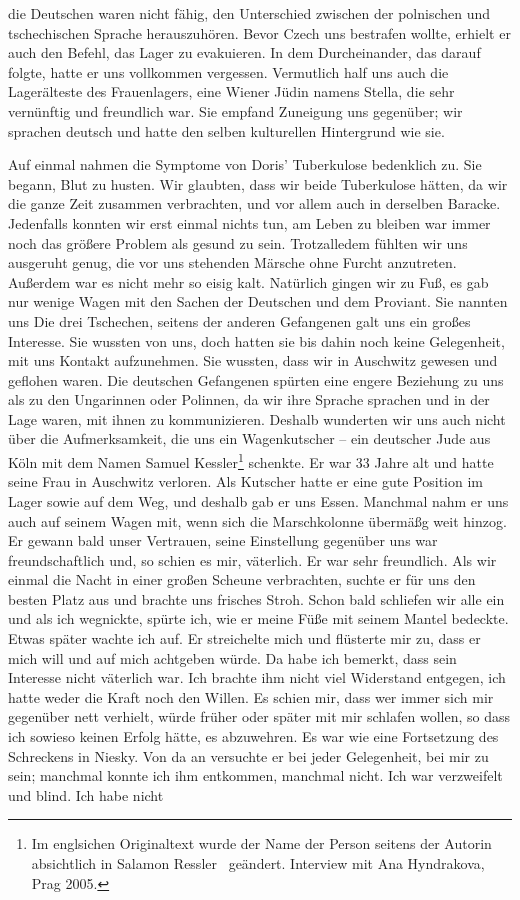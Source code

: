 die Deutschen waren nicht fähig, den Unterschied zwischen der polnischen und tschechischen Sprache herauszuhören. Bevor Czech uns bestrafen wollte, erhielt er auch den Befehl, das Lager zu evakuieren. In dem Durcheinander, das darauf folgte, hatte er uns vollkommen vergessen. Vermutlich half uns auch die Lagerälteste des Frauenlagers, eine Wiener Jüdin namens Stella, die sehr vernünftig und freundlich war. Sie empfand Zuneigung uns gegenüber; wir sprachen deutsch und hatte den selben kulturellen Hintergrund wie sie.

Auf einmal nahmen die Symptome von Doris' Tuberkulose bedenklich zu. Sie begann, Blut zu husten. Wir glaubten, dass wir beide Tuberkulose hätten, da wir die ganze Zeit zusammen verbrachten, und vor allem auch in derselben Baracke. Jedenfalls konnten wir erst einmal nichts tun, am Leben zu bleiben war immer noch das größere Problem als gesund zu sein. Trotzalledem fühlten wir uns ausgeruht genug, die vor uns stehenden Märsche ohne Furcht anzutreten. Außerdem war es nicht mehr so eisig kalt. Natürlich gingen wir zu Fuß, es gab nur wenige Wagen mit den Sachen der Deutschen und dem Proviant. Sie nannten uns \glqq Die drei Tschechen\grqq, seitens der anderen Gefangenen galt uns ein großes Interesse. Sie wussten von uns, doch hatten sie bis dahin noch keine Gelegenheit, mit uns Kontakt aufzunehmen. Sie wussten, dass wir in Auschwitz gewesen und geflohen waren. Die deutschen Gefangenen spürten eine engere Beziehung zu uns als zu den Ungarinnen oder Polinnen, da wir ihre Sprache sprachen und in der Lage waren, mit ihnen zu kommunizieren. Deshalb wunderten wir uns auch nicht über die Aufmerksamkeit, die uns ein Wagenkutscher -- ein deutscher Jude aus Köln mit dem Namen Samuel Kessler\footnote{Im englsichen Originaltext wurde der Name der Person seitens der Autorin absichtlich in \glqq Salamon Ressler \grqq~geändert. Interview mit Ana Hyndrakova, Prag 2005.} schenkte. Er war 33 Jahre alt und hatte seine Frau in Auschwitz verloren. Als Kutscher hatte er eine gute Position im Lager sowie auf dem Weg, und deshalb gab er uns Essen. Manchmal nahm er uns auch auf seinem Wagen mit, wenn sich die Marschkolonne übermäßg weit hinzog. Er gewann bald unser Vertrauen, seine Einstellung gegenüber uns war freundschaftlich und, so schien es mir, väterlich. Er war sehr freundlich. Als wir einmal die Nacht in einer großen Scheune verbrachten, suchte er für uns den besten Platz aus und brachte uns frisches Stroh. Schon bald schliefen wir alle ein und als ich wegnickte, spürte ich, wie er meine Füße mit seinem Mantel bedeckte. Etwas später wachte ich auf. Er streichelte mich und flüsterte mir zu, dass er mich will und auf mich achtgeben würde. Da habe ich bemerkt, dass sein Interesse nicht väterlich war. Ich brachte ihm nicht viel Widerstand entgegen, ich hatte weder die Kraft noch den Willen. Es schien mir, dass wer immer sich mir gegenüber nett verhielt, würde früher oder später mit mir schlafen wollen, so dass ich sowieso keinen Erfolg hätte, es abzuwehren. Es war wie eine Fortsetzung des Schreckens in Niesky. Von da an versuchte er bei jeder Gelegenheit, bei mir zu sein; manchmal konnte ich ihm entkommen, manchmal nicht. Ich war verzweifelt und blind. Ich habe nicht 